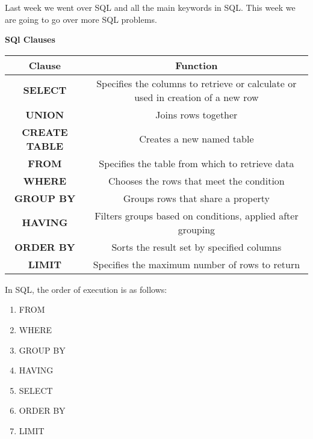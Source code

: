 Last week we went over SQL and all the main keywords in SQL. This week we are going to go over more SQL problems.

\begin{center}
    \textbf{SQl Clauses}
    \begin{tabular}{|c|c|}
     \hline
     \textbf{Clause} & \textbf{Function} \\
     \hline
     \textbf{SELECT} & Specifies the columns to retrieve or calculate or used in creation of a new row \\
     \hline
     \textbf{UNION} & Joins rows together \\
     \hline
     \textbf{CREATE TABLE} & Creates a new named table \\
     \hline
     \textbf{FROM} & Specifies the table from which to retrieve data \\
     \hline
     \textbf{WHERE} & Chooses the rows that meet the condition \\
     \hline
     \textbf{GROUP BY} & Groups rows that share a property \\
     \hline
     \textbf{HAVING} & Filters groups based on conditions, applied after grouping \\
     \hline
     \textbf{ORDER BY} & Sorts the result set by specified columns \\
     \hline
     \textbf{LIMIT} & Specifies the maximum number of rows to return \\
     \hline
    \end{tabular}
\end{center}

In SQL, the order of execution is as follows:
\begin{enumerate}
    \item FROM
    \item WHERE
    \item GROUP BY
    \item HAVING
    \item SELECT
    \item ORDER BY
    \item LIMIT
\end{enumerate}